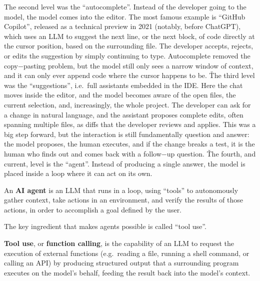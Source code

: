 The second level was the ``autocomplete''. Instead of the developer going to the model, the model comes into the
editor. The most famous example is ``GitHub Copilot'', released as a technical preview in 2021 (notably, before
ChatGPT), which uses an LLM to suggest the next line, or the next block, of code directly at the cursor position,
based on the surrounding file. The developer accepts, rejects, or edits the suggestion by simply continuing to type.
Autocomplete removed the copy$-$pasting problem, but the model still only sees a narrow window of context, and it can
only ever append code where the cursor happens to be. \v

The third level was the ``suggestions'', i.e.\ full assistants embedded in the IDE. Here the chat moves inside the
editor, and the model becomes aware of the open files, the current selection, and, increasingly, the whole project.
The developer can ask for a change in natural language, and the assistant proposes complete edits, often spanning
multiple files, as diffs that the developer reviews and applies. This was a big step forward, but the interaction is
still fundamentally question and answer: the model proposes, the human executes, and if the change breaks a test, it
is the human who finds out and comes back with a follow$-$up question. \v

The fourth, and current, level is the ``agent''. Instead of producing a single answer, the model is placed inside a
loop where it can act on its own.

\bd[AI Agent]
An \textbf{AI agent} is an LLM that runs in a loop, using ``tools'' to autonomously gather context, take actions in
an environment, and verify the results of those actions, in order to accomplish a goal defined by the user.
\ed

The key ingredient that makes agents possible is called ``tool use''.

\textbf{Tool use}, or \textbf{function calling}, is the capability of an LLM to request the execution of external
functions (e.g.\ reading a file, running a shell command, or calling an API) by producing structured output that a
surrounding program executes on the model's behalf, feeding the result back into the model's context.
\ed

